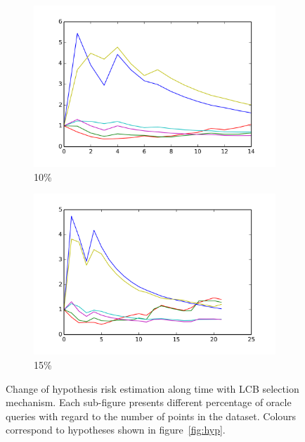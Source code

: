 \documentclass[12pt, a4paper, pdflatex, leqno, twoside]{report}
\begin{document}
\begin{figure}[htbp]
    \begin{subfigure}{.5\linewidth}\centering
    \includegraphics[width=1.1\textwidth]{graphics/convergence_LCB010.png}
    \caption{10\%\label{fig:LCB_conv.ALL:10}}
  \end{subfigure}
  \begin{subfigure}{.5\linewidth}\centering
    \includegraphics[width=1.1\textwidth]{graphics/convergence_LCB015.png}
    \caption{15\%\label{fig:LCB_conv.ALL:15}}
  \end{subfigure}

  \caption{Change of hypothesis risk estimation along time with LCB selection 
mechanism. Each sub-figure presents different percentage of oracle queries with 
regard to the number of points in the dataset. Colours correspond to hypotheses 
shown in figure~\ref{fig:hyp}.\label{fig:LCB_conv.ALL}}
\end{figure}
\end{document}
